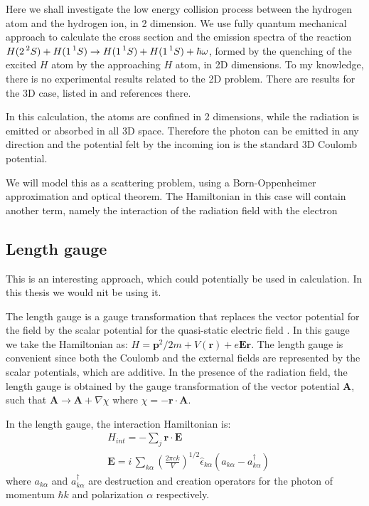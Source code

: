 Here we shall investigate the low energy collision process between the hydrogen atom and the hydrogen ion, in 2 dimension. We use fully quantum mechanical approach to calculate the cross section and the emission spectra of the reaction $ H(2\prescript{2}{}S) + H(1\prescript{1}{}S)\rightarrow H(1\prescript{1}{}S) + H(1\prescript{1}{}S) + \hbar\omega $, formed by the quenching of the excited $ H $ atom by the approaching $ H $ atom, in 2D dimensions. To my knowledge, there is no experimental results related to the 2D problem. There are results for the 3D case, listed in \cite{Zygelman88} and references there.

In this calculation, the atoms are confined in 2 dimensions, while the radiation is emitted or absorbed in all 3D space. Therefore the photon can be emitted in any direction and the potential felt by the incoming ion is the standard 3D Coulomb potential.

We will model this as a scattering problem, using a Born-Oppenheimer approximation and optical theorem. The Hamiltonian in this case will contain another term, namely the interaction of the radiation field with the electron

\subsection*{Length gauge}


This is an interesting approach, which could potentially be used in calculation. In this thesis we would nit be using it.

The length gauge is a gauge transformation that replaces the vector potential for the field by the scalar potential for the quasi-static electric field \cite{LengthGauge3}.  In this gauge we take the Hamiltonian as: $ H = \mathbf{p}^2/2m + V(\mathbf{r})  + e\mathbf{E}\mathbf{r} $. The length gauge is convenient since both the Coulomb and the external fields are represented by the scalar potentials, which are additive. In the presence of the radiation field, the length gauge is obtained by the gauge transformation of the vector potential $ \mathbf{A} $, such that $ \mathbf{A} \rightarrow \mathbf{A} + \nabla \chi $ where $ \chi = - \mathbf{r} \cdot \mathbf{A} $. 

In the length gauge, the interaction Hamiltonian is:
\begin{equation}
\begin{split}
& H_{int} = -\sum_j{ \mathbf{r}\cdot\mathbf{E} } \\[.8em]
& \mathbf{E} = i\,\sum_{k\alpha}{\left(\frac{2\pi c k}{V}\right)^{1/2}\hat{\epsilon}_{k\alpha}\left(a_{k\alpha} - a^{\dagger}_{k\alpha}\right)}
\end{split}
\end{equation}
where $ a_{k\alpha} $ and $ a^{\dagger}_{k\alpha} $ are destruction and creation operators for the photon of momentum $ \hbar k $ and polarization $ \alpha $ respectively.

